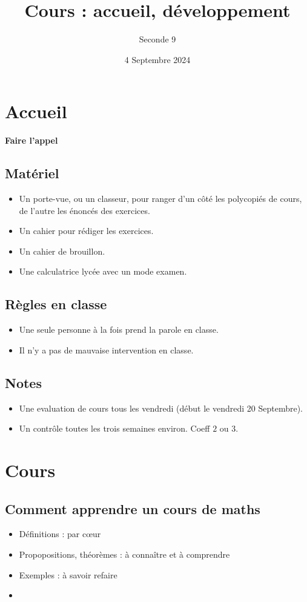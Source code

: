 \documentclass{article}
\author{Seconde 9}
\date{4 Septembre 2024}
\title{Cours : accueil, développement}
\begin{document}
\maketitle

\section{Accueil}
\textbf{Faire l'appel}
\subsection{Matériel}
\begin{itemize}
\item Un porte-vue, ou un classeur, pour ranger d'un côté les polycopiés de cours, de l'autre les énoncés des exercices.
\item Un cahier pour rédiger les exercices.
\item Un cahier de brouillon.
\item Une calculatrice lycée avec un mode examen.
\end{itemize}
\subsection{Règles en classe}
\begin{itemize}
\item Une seule personne à la fois prend la parole en classe.
\item Il n'y a pas de mauvaise intervention en classe.
\end{itemize}
\subsection{Notes}
\begin{itemize}
\item Une evaluation de cours tous les vendredi (début le vendredi 20 Septembre).
\item Un contrôle toutes les trois semaines environ. Coeff $2$ ou $3$.
\end{itemize}
\section{Cours}
\subsection{Comment apprendre un cours de maths}
\begin{itemize}
\item Définitions : par cœur
\item Propopositions, théorèmes : à connaître et à comprendre
\item Exemples : à savoir refaire
\item 
\end{itemize}
\end{document}
